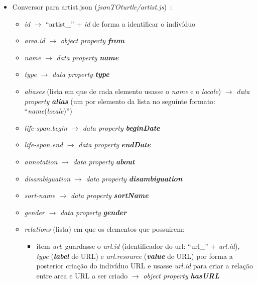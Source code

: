 \documentclass{article}
\begin{document}
\begin{itemize}
\begin{itemize}
\begin{itemize}
                \end{itemize}
        \end{itemize}
    \item Conversor para artist.json (\textit{jsonTOturtle/artist.js})~\cite{mbArt}:
        \begin{itemize}
            \item \textit{id} $\to$ ``artist\_'' + \textit{id} de forma a identificar o indivíduo
            \item \textit{area.id} $\to$ \textit{object property} \textit{\textbf{from}}
            \item \textit{name} $\to$ \textit{data property} \textit{\textbf{name}}
            \item \textit{type} $\to$ \textit{data property} \textit{\textbf{type}}
            \item \textit{aliases} (lista em que de cada elemento usasse o \textit{name} e o \textit{locale}) $\to$ \textit{data property} \textit{\textbf{alias}} (um por elemento da lista no seguinte formato: ``\textit{name}(\textit{locale})'')
            \item \textit{life-span.begin} $\to$ \textit{data property} \textit{\textbf{beginDate}}
            \item \textit{life-span.end} $\to$ \textit{data property} \textit{\textbf{endDate}}
            \item \textit{annotation} $\to$ \textit{data property} \textit{\textbf{about}}
            \item \textit{disambiguation} $\to$ \textit{data property} \textit{\textbf{disambiguation}}
            \item \textit{sort-name} $\to$ \textit{data property} \textit{\textbf{sortName}}
            \item \textit{gender} $\to$ \textit{data property} \textit{\textbf{gender}}
            \item \textit{relations} (lista) em que os elementos que possuirem:
                \begin{itemize}
                    \item item \textit{url}: guardasse o \textit{url.id} (identificador do url: ``url\_'' + \textit{url.id}), \textit{type} (\textit{\textbf{label}} de URL) e \textit{url.resource} (\textit{\textbf{value}} de URL) por forma a posterior criação do indivíduo URL e usasse \textit{url.id} para criar a relação entre area e URL a ser criado $\to$ \textit{object property} \textit{\textbf{hasURL}}
                \end{itemize}

\end{itemize}
\end{itemize}
\end{document}
